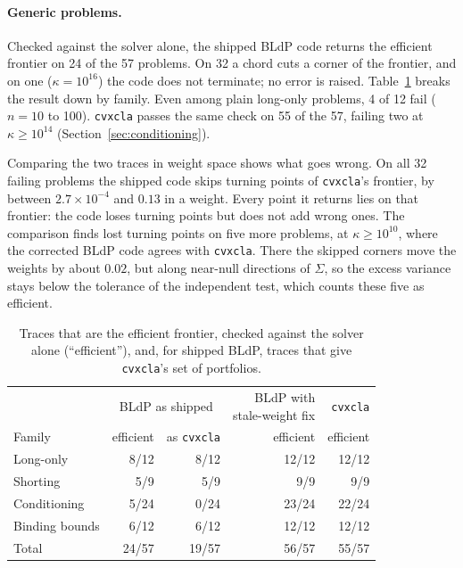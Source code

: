 \documentclass[11pt,a4paper]{article}
\newcommand{\code}[1]{\texttt{#1}}
\newcommand{\cvxcla}{\code{cvxcla}}
\begin{document}
\paragraph{Generic problems.}

Checked against the solver alone, the shipped BLdP code returns the
efficient frontier on 24 of the 57 problems. On 32 a chord cuts a corner of
the frontier, and on one ($\kappa = 10^{16}$) the code does not terminate; no
error is raised. Table~\ref{tab:families} breaks the result down by family.
Even among plain long-only problems, 4 of 12 fail ($n = 10$ to 100). \cvxcla{}
passes the same check on 55 of the 57, failing two at $\kappa \ge 10^{14}$
(Section~\ref{sec:conditioning}).

Comparing the two traces in weight space shows what goes wrong. On all 32
failing problems the shipped code skips turning points of \cvxcla{}'s
frontier, by between $2.7 \times 10^{-4}$ and $0.13$ in a weight. Every point
it returns lies on that frontier: the code loses turning points but does not
add wrong ones. The comparison finds lost turning points on five more
problems, at $\kappa \ge 10^{10}$, where the corrected BLdP code agrees with
\cvxcla{}. There the skipped corners move the weights by about $0.02$, but
along near-null directions of $\Sigma$, so the excess variance stays below the
tolerance of the independent test, which counts these five as efficient.

\begin{table}[ht]
  \centering
  \small
  \caption{Traces that are the efficient frontier, checked against the
    solver alone (``efficient''), and, for shipped BLdP, traces that give
    \cvxcla{}'s set of portfolios.}\label{tab:families}
  \begin{tabular}{lrrrr}
    \toprule
    & \multicolumn{2}{c}{BLdP as shipped}
    & \shortstack[r]{BLdP with\\stale-weight fix}
    & \cvxcla{} \\
    \cmidrule(lr){2-3}
    Family & efficient & as \cvxcla{} & efficient & efficient \\
    \midrule
    Long-only        & 8/12  & 8/12  & 12/12 & 12/12 \\
    Shorting         & 5/9   & 5/9   & 9/9   & 9/9   \\
    Conditioning     & 5/24  & 0/24  & 23/24 & 22/24 \\
    Binding bounds   & 6/12  & 6/12  & 12/12 & 12/12 \\
    \midrule
    Total            & 24/57 & 19/57 & 56/57 & 55/57 \\
    \bottomrule
  \end{tabular}
\end{table}
\end{document}
